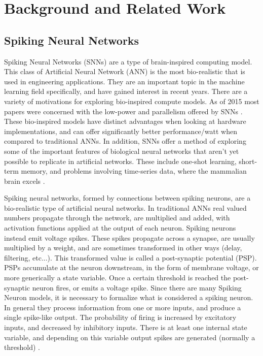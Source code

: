 %
%


\chapter{Background and Related Work}\label{section:background}
    \section{Spiking Neural Networks}
    Spiking Neural Networks (SNNs) are a type of brain-inspired computing model. This class of
    Artificial Neural Network (ANN) is the most bio-realistic that is used in
    engineering applications. They are an important topic in the machine
    learning field specifically, and have gained interest in recent years. There
    are a variety of motivations for exploring bio-inspired compute models. As
    of 2015 most papers were concerned with the low-power and parallelism
    offered by SNNs \cite{schuman_2017}. These bio-inspired models
    have distinct advantages when looking at hardware implementations, and can
    offer significantly better performance/watt when compared to traditional
    ANNs. In addition, SNNs offer a method of exploring some of the important
    features of biological neural networks that aren't yet possible to replicate
    in artificial networks. These include one-shot learning, short-term memory,
    and problems involving time-series data, where the mammalian brain excels
    \cite{kasabov_2013}.

    
    Spiking neural networks, formed by connections between spiking neurons, are
    a bio-realistic type of artificial neural networks. In traditional ANNs real
    valued numbers propagate through the network, are multiplied and added, with
    activation functions applied at the output of each neuron. Spiking neurons
    instead emit voltage spikes. These spikes propagate across a synapse, are
    usually multiplied by a weight, and are sometimes transformed in other ways
    (delay, filtering, etc...). This transformed value is called a post-synaptic
    potential (PSP). PSPs accumulate at the neuron downstream, in the form of
    membrane voltage, or more generically a state variable. Once a certain
    threshold is reached the post-synaptic neuron fires, or emits a voltage
    spike. Since there are many Spiking Neuron models, it is necessary to
    formalize what is considered a spiking neuron. In general they process
    information from one or more inputs, and produce a single spike-like
    output. The probability of firing is increased by excitatory inputs, and
    decreased by inhibitory inputs. There is at least one internal state
    variable, and depending on this variable output spikes are generated
    (normally a threshold) \cite{ponulak_2011}.
    
